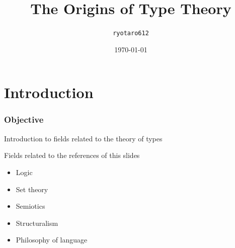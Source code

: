 \documentclass[unicode, 14pt, aspectratio=169]{beamer}
\date{\today}
\title{The Origins of Type Theory}
\author{\texttt{ryotaro612}}
\begin{document}
\begin{frame}
\titlepage
\end{frame}
\section{Introduction}
\begin{frame}
  \frametitle{Objective}
  {\large Introduction to fields related to the theory of types}
  \par
  \vspace{16pt}
  Fields related to the references of this slides
  \begin{itemize}
  \item Logic
  \item Set theory
  \item Semiotics
  \item Structuralism
  \item Philosophy of language
  \end{itemize}
\end{frame}
\end{document}
